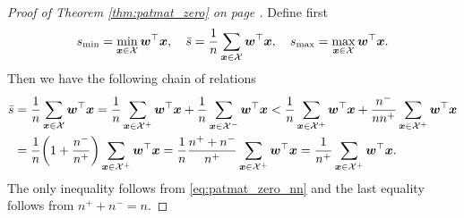 \patmatzero*
\begin{proof}[Proof of Theorem \ref{thm:patmat_zero} on page \pageref{thm:patmat_zero}]
  Define first
  \begin{equation*}
    \begin{aligned}
      s_{\min} = \min_{\bm{x} \in \mathcal{X}}\bm{w}^\top \bm{x}, \quad
      \bar{s} = \frac{1}{n}\sum_{\bm{x} \in \mathcal{X}}\bm{w}^\top \bm{x} , \quad
      s_{\max} = \max_{\bm{x} \in \mathcal{X}}\bm{w}^\top \bm{x}.
    \end{aligned}
  \end{equation*}
  Then we have the following chain of relations
  \begin{equation}\label{eq:patmat_zero_aux0}
    \begin{aligned}
      \bar{s}
      & = \frac{1}{n}\sum_{\bm{x} \in \Xc}\bm{w}^\top \bm{x}
        = \frac{1}{n}\sum_{\bm{x} \in \Xc^+}\bm{w}^\top \bm{x} + \frac{1}{n}\sum_{\bm{x} \in \Xc^-}\bm{w}^\top \bm{x}
        < \frac{1}{n}\sum_{\bm{x} \in \Xc^+}\bm{w}^\top \bm{x} + \frac{n^-}{nn^+}\sum_{\bm{x} \in \Xc^+}\bm{w}^\top \bm{x} \\
      & = \frac 1n\left(1+\frac{n^-}{n^+}\right)\sum_{\bm{x} \in \Xc^+}\bm{w}^\top \bm{x}
        = \frac 1n\frac{n^++n^-}{n^+}\sum_{\bm{x} \in \Xc^+}\bm{w}^\top \bm{x} = \frac 1{n^+}\sum_{\bm{x} \in \Xc^+}\bm{w}^\top \bm{x}.
    \end{aligned}
  \end{equation}
  The only inequality follows from \eqref{eq:patmat_zero_nn} and the last equality follows from $n^++n^-=n$.
  

\end{proof}
